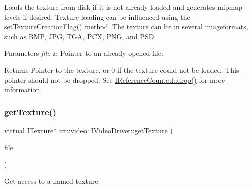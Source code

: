 Loads the texture from disk if it is not already loaded and generates mipmap levels if desired. Texture loading can be influenced using the \hyperlink{classirr_1_1video_1_1IVideoDriver_a868b58a6b86b9e4841ca3879ce246c4e}{set\+Texture\+Creation\+Flag()} method. The texture can be in several imageformats, such as B\+MP, J\+PG, T\+GA, P\+CX, P\+NG, and P\+SD. 
\begin{DoxyParams}{Parameters}
{\em file} & Pointer to an already opened file. \\
\hline
\end{DoxyParams}
\begin{DoxyReturn}{Returns}
Pointer to the texture, or 0 if the texture could not be loaded. This pointer should not be dropped. See \hyperlink{classirr_1_1IReferenceCounted_a03856a09355b89d178090c4a5f738543}{I\+Reference\+Counted\+::drop()} for more information. 
\end{DoxyReturn}
\mbox{\label{classirr_1_1video_1_1IVideoDriver_aaf989c8688ffe2a28a4b8e7b6ec2bce7}} 
\subsubsection{\texorpdfstring{get\+Texture()}{getTexture()}\hspace{0.1cm}{\footnotesize\ttfamily [4/4]}}
{\footnotesize\ttfamily virtual \hyperlink{classirr_1_1video_1_1ITexture}{I\+Texture}$\ast$ irr\+::video\+::\+I\+Video\+Driver\+::get\+Texture (\begin{DoxyParamCaption}\item[{\hyperlink{classirr_1_1io_1_1IReadFile}{io\+::\+I\+Read\+File} $\ast$}]{file }\end{DoxyParamCaption})\hspace{0.3cm}{\ttfamily [pure virtual]}}



Get access to a named texture. 

